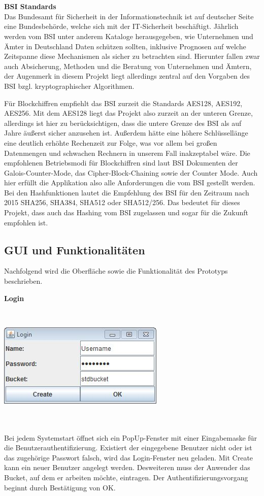 \documentclass[12pt,a4paper,bibliography=totocnumbered,listof=totocnumbered]{scrartcl}
\begin{document}
\\\\\textbf{BSI Standards}\\
Das Bundesamt für Sicherheit in der Informationstechnik ist auf deutscher Seite eine Bundesbehörde, welche sich mit der IT-Sicherheit beschäftigt. Jährlich werden vom BSI unter anderem Kataloge herausgegeben, wie Unternehmen und Ämter in Deutschland Daten schützen sollten, inklusive Prognosen auf welche Zeitspanne diese Mechanismen als sicher zu betrachten sind. Hierunter fallen zwar auch Absicherung, Methoden und die  Beratung von Unternehmen und Ämtern, der Augenmerk in diesem Projekt liegt allerdings zentral auf den Vorgaben des BSI bzgl. kryptographischer Algorithmen.

Für Blockchiffren empfiehlt das BSI zurzeit die Standards AES128, AES192, AES256. Mit dem AES128 liegt das Projekt also zurzeit an der unteren Grenze, allerdings ist hier zu berücksichtigen, dass die untere Grenze des BSI als auf Jahre äußerst sicher anzusehen ist. Außerdem hätte eine höhere Schlüssellänge eine deutlich erhöhte Rechenzeit zur Folge, was vor allem bei großen Datenmengen und schwachen Rechnern in unserem Fall inakzeptabel wäre. Die empfohlenen Betriebsmodi für Blockchiffren sind laut BSI Dokumenten der Galois-Counter-Mode, das Cipher-Block-Chaining sowie der Counter Mode. Auch hier erfüllt die Applikation also alle Anforderungen die vom BSI gestellt werden. Bei den Hashfunktionen lautet die Empfehlung des BSI für den Zeitraum nach 2015 SHA256, SHA384, SHA512 oder SHA512/256. Das bedeutet für dieses Projekt, dass auch das Hashing vom BSI zugelassen und sogar für die Zukunft empfohlen ist. \cite{12}\cite{13}

\subsection{GUI und Funktionalitäten}\label{GUIV}
Nachfolgend wird die Oberfläche sowie die Funktionalität des Prototyps beschrieben.

\textbf{Login}

\vspace{1em}
$\;$\\
\begin{minipage}{\linewidth}
	\centering
	\includegraphics[width=0.4\linewidth]{Login.jpg}
	\label{Login}
\end{minipage}
\\\\Bei jedem Systemstart öffnet sich ein PopUp-Fenster mit einer Eingabemaske für die Benutzerauthentifizierung. Existiert der eingegebene Benutzer nicht oder ist das zugehörige Passwort falsch, wird das Login-Fenster neu geladen. Mit Create kann ein neuer Benutzer angelegt werden. Desweiteren muss der Anwender das Bucket, auf dem er arbeiten möchte, eintragen. Der Authentifizierungsvorgang beginnt durch Bestätigung von OK.
\end{document}
